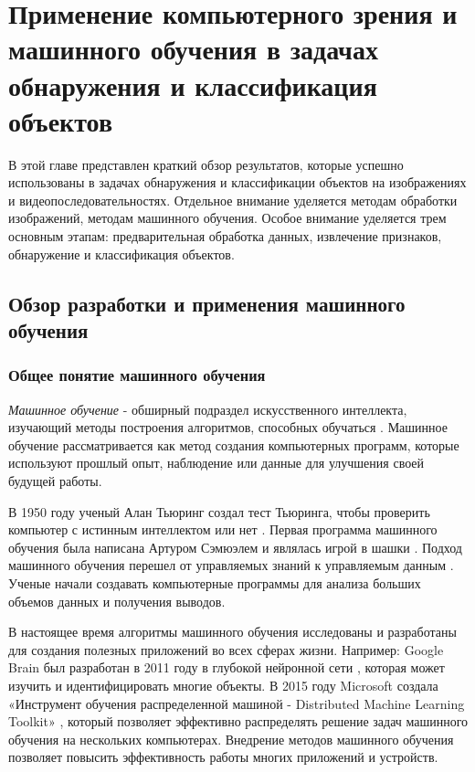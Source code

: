 \documentclass[a4paper,14pt]{extreport}
\begin{document}


\chapter{Применение компьютерного зрения и машинного обучения в задачах обнаружения и классификация объектов} \label{chapt1}
В этой главе представлен краткий обзор результатов, которые успешно использованы в задачах обнаружения и классификации объектов на изображениях и видеопоследовательностях.  Отдельное внимание уделяется методам обработки изображений, методам машинного обучения. Особое внимание уделяется трем основным этапам: предварительная обработка данных, извлечение признаков, обнаружение и классификация объектов.

\section{Обзор разработки и применения машинного обучения} \label{chapter1.1}
\subsection{Общее понятие машинного обучения}
\textit{Машинное обучение }- обширный подраздел искусственного интеллекта, изучающий методы построения алгоритмов, способных обучаться \cite{h20, h21, h22}. Машинное обучение рассматривается как метод создания компьютерных программ, которые используют прошлый опыт, наблюдение или данные для улучшения своей будущей работы.

В 1950 году ученый Алан Тьюринг создал тест Тьюринга, чтобы проверить компьютер с истинным интеллектом или нет \cite{h23}. Первая программа машинного обучения была написана Артуром Сэмюэлем и являлась игрой в шашки \cite{h24}. Подход машинного обучения перешел от управляемых знаний \cite{h25} к управляемым данным \cite{h26}. Ученые начали создавать компьютерные программы для анализа больших объемов данных и получения выводов.

В настоящее время алгоритмы машинного обучения исследованы и разработаны для создания полезных приложений во всех сферах жизни.
Например: Google Brain был разработан в 2011 году в глубокой нейронной сети \cite{h27}, которая может изучить и идентифицировать многие объекты. В 2015 году Microsoft создала «Инструмент обучения распределенной машиной - Distributed Machine Learning Toolkit» \cite{h28}, который позволяет эффективно распределять решение задач машинного обучения на нескольких компьютерах.
Внедрение методов машинного обучения позволяет повысить эффективность работы многих приложений и устройств.
\end{document}
